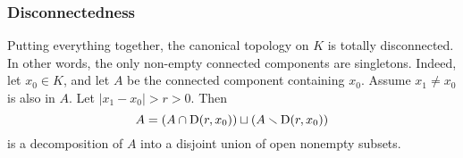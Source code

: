 \subsubsection{Disconnectedness}
Putting everything together, the canonical topology on $K$ is totally 
disconnected. In other words, the only non-empty connected components are 
singletons. Indeed, let $x_0\in K$, and let $A$ be the connected component 
containing $x_0$. Assume $x_1\ne x_0$ is also in $A$. Let 
$|x_1-x_0|>r>0$. Then 
\[
  A = \left(A\cap \operatorname{D}(r,x_0)\right) \sqcup \left(A\smallsetminus \operatorname{D}(r,x_0)\right) 
\]
is a decomposition of $A$ into a disjoint union of open nonempty subsets. 




